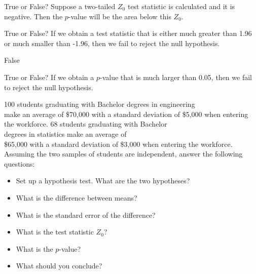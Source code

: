 \documentclass[11pt]{book}\usepackage[]{graphicx}\usepackage[]{color}
\begin{document}
\begin{exercises}
\begin{exercise}
True or False? Suppose a two-tailed $Z_0$ test statistic is calculated and it is negative. Then the $p$-value will be the area below this $Z_0$.

\end{exercise}
% 
% 

\begin{exercise} %

True or False? If we obtain a test statistic that is either much greater than 1.96 or much smaller than -1.96, then we fail to reject the null hypothesis.

\end{exercise}
\begin{solution} %

False 

\end{solution}


\begin{exercise} %

True or False? If we obtain a $p$-value that is much larger than 0.05, then we fail to reject the null hypothesis.

\end{exercise}
% 
% 

\begin{exercise}  %



100 students graduating  with Bachelor degrees in engineering \\ make an average of \$70,000 with a standard deviation of \$5,000 when entering the workforce. 68 students graduating with Bachelor \\ degrees in statistics make an average of \\  \$65,000 with a standard deviation of \$3,000 when entering the workforce. Assuming the two samples of students are independent, answer the following questions:

\begin{itemize}
  \item Set up a hypothesis test. What are the two hypotheses?
  \item What is the difference between means?
  \item What is the standard error of the difference?
  \item What is the test statistic $Z_0$?
  \item What is the $p$-value?
  \item What should you conclude?
\end{itemize}


\end{exercise}
\end{exercises}
\end{document}
